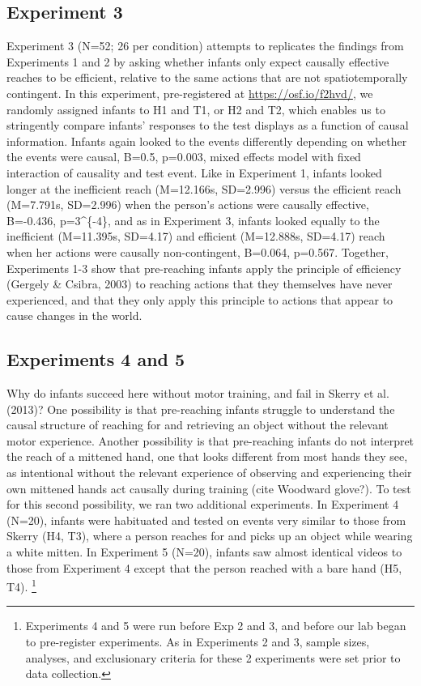 \documentclass[]{article}
\let\rmarkdownfootnote\footnote%
\def\footnote{\protect\rmarkdownfootnote}
\begin{document}
\subsection{Experiment 3}\label{experiment-3}

Experiment 3 (N=52; 26 per condition) attempts to replicates the
findings from Experiments 1 and 2 by asking whether infants only expect
causally effective reaches to be efficient, relative to the same actions
that are not spatiotemporally contingent. In this experiment,
pre-registered at \url{https://osf.io/f2hvd/}, we randomly assigned
infants to H1 and T1, or H2 and T2, which enables us to stringently
compare infants' responses to the test displays as a function of causal
information. Infants again looked to the events differently depending on
whether the events were causal, B=0.5, p=0.003, mixed effects model with
fixed interaction of causality and test event. Like in Experiment 1,
infants looked longer at the inefficient reach (M=12.166s, SD=2.996)
versus the efficient reach (M=7.791s, SD=2.996) when the person's
actions were causally effective, B=-0.436, p=3\^{}\{-4\}, and
as in Experiment 3, infants looked equally to the inefficient
(M=11.395s, SD=4.17) and efficient (M=12.888s, SD=4.17) reach when her
actions were causally non-contingent, B=0.064, p=0.567. Together,
Experiments 1-3 show that pre-reaching infants apply the principle of
efficiency (Gergely \& Csibra, 2003) to reaching actions that they
themselves have never experienced, and that they only apply this
principle to actions that appear to cause changes in the world.

\subsection{Experiments 4 and 5}\label{experiments-4-and-5}

Why do infants succeed here without motor training, and fail in Skerry
et al. (2013)? One possibility is that pre-reaching infants struggle to
understand the causal structure of reaching for and retrieving an object
without the relevant motor experience. Another possibility is that
pre-reaching infants do not interpret the reach of a mittened hand, one
that looks different from most hands they see, as intentional without
the relevant experience of observing and experiencing their own mittened
hands act causally during training (cite Woodward glove?). To test for
this second possibility, we ran two additional experiments. In
Experiment 4 (N=20), infants were habituated and tested on events very
similar to those from Skerry (H4, T3), where a person reaches for and
picks up an object while wearing a white mitten. In Experiment 5 (N=20),
infants saw almost identical videos to those from Experiment 4 except
that the person reached with a bare hand (H5, T4). \footnote{Experiments
  4 and 5 were run before Exp 2 and 3, and before our lab began to
  pre-register experiments. As in Experiments 2 and 3, sample sizes,
  analyses, and exclusionary criteria for these 2 experiments were set
  prior to data collection.}
\end{document}

